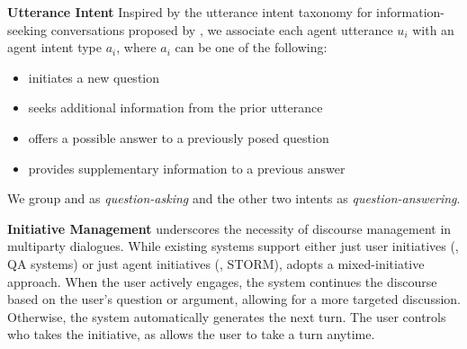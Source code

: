 \documentclass[11pt]{article}
\begin{document}
\noindent
\textbf{Utterance Intent}\quad
Inspired by the utterance intent taxonomy for information-seeking conversations proposed by \citet{Qu_2019}, we associate each agent utterance $u_i$ with an agent intent type $a_i$, where $a_i$ can be one of the following: 
\begin{itemize}
\item
{} initiates a new question 
\item
{} seeks additional information from the prior utterance
\item
{} offers a possible answer to a previously posed question 
\item
{} provides supplementary information to a previous answer
\end{itemize}
We group  and  as \textit{question-asking} and the other two  intents as \textit{question-answering}.


\noindent
\textbf{Initiative Management}\quad
\citet{traum2003issues} underscores the necessity of discourse management in multiparty dialogues. %
While existing systems support either just user initiatives (\eg, QA systems) or just agent initiatives (\eg, STORM), \system adopts a mixed-initiative approach. When the user actively engages, the system continues the discourse based on the user's question or argument, allowing for a more targeted discussion. Otherwise, the system automatically generates the next turn. The user controls who takes the initiative, as \system allows the user to take a turn anytime.
\end{document}
